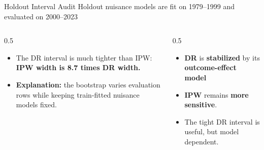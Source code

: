 \documentclass[aspectratio=169]{beamer}
\begin{document}
\begin{frame}{Holdout Interval Audit}
Holdout nuisance models are fit on 1979--1999 and evaluated on 2000--2023
\vspace{0.2cm}
\begin{columns}
    \begin{column}{0.5\textwidth}
        \begin{itemize}
        \item The DR interval is much tighter than IPW: \textbf{IPW width is 8.7 times DR width.}
        \item \textbf{Explanation:} the bootstrap varies evaluation rows while keeping train-fitted nuisance models fixed.
        \end{itemize}
    \end{column}
    \begin{column}{0.5\textwidth}
        \begin{itemize}
        \item \textbf{DR} is \textbf{stabilized} by its \textbf{outcome-effect model}
        \item \textbf{IPW} remains \textbf{more sensitive}.
        \item The tight DR interval is useful, but model dependent.
        \end{itemize}
    \end{column}
\end{columns}
\end{frame}
\end{document}
